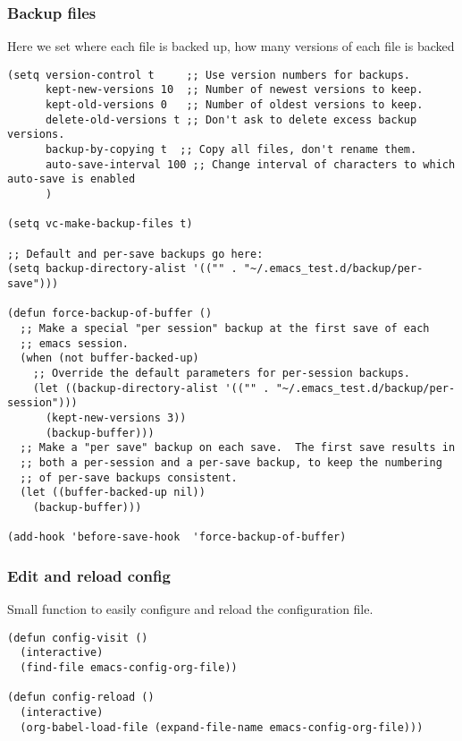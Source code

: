\documentclass[11pt]{article}
\begin{document}
\subsubsection{Backup files}
\label{sec:orgd31955e}
Here we set where each file is backed up, how many versions of each file is backed
\begin{verbatim}
(setq version-control t     ;; Use version numbers for backups.
      kept-new-versions 10  ;; Number of newest versions to keep.
      kept-old-versions 0   ;; Number of oldest versions to keep.
      delete-old-versions t ;; Don't ask to delete excess backup versions.
      backup-by-copying t  ;; Copy all files, don't rename them.
      auto-save-interval 100 ;; Change interval of characters to which auto-save is enabled
      )

(setq vc-make-backup-files t)

;; Default and per-save backups go here:
(setq backup-directory-alist '(("" . "~/.emacs_test.d/backup/per-save")))

(defun force-backup-of-buffer ()
  ;; Make a special "per session" backup at the first save of each
  ;; emacs session.
  (when (not buffer-backed-up)
    ;; Override the default parameters for per-session backups.
    (let ((backup-directory-alist '(("" . "~/.emacs_test.d/backup/per-session")))
	  (kept-new-versions 3))
      (backup-buffer)))
  ;; Make a "per save" backup on each save.  The first save results in
  ;; both a per-session and a per-save backup, to keep the numbering
  ;; of per-save backups consistent.
  (let ((buffer-backed-up nil))
    (backup-buffer)))

(add-hook 'before-save-hook  'force-backup-of-buffer)
\end{verbatim}
\subsubsection{Edit and reload config}
\label{sec:orgba56d87}
Small function to easily configure and reload the configuration file.

\begin{verbatim}
(defun config-visit ()
  (interactive)
  (find-file emacs-config-org-file))

(defun config-reload ()
  (interactive)
  (org-babel-load-file (expand-file-name emacs-config-org-file)))
\end{verbatim}
\end{document}
